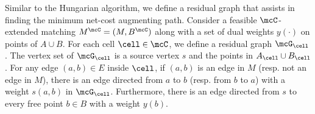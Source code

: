 Similar to the Hungarian algorithm, we define a residual graph that assists in finding the minimum net-cost augmenting path. Consider a feasible $\mcC$-extended matching $M^{\mcC}=(M,B^{\mcC})$ along with a set of dual weights $y(\cdot)$ on points of $A\cup B$. For each cell $\cell \in \mcC$, we define a residual graph $\mcG_{\cell}$. The vertex set of $\mcG_{\cell}$ is a source vertex $s$ and the points in $A_{\cell}\cup B_{\cell}$. For any edge $(a,b)\in E$ inside $\cell$, if $(a,b)$ is an edge in $M$ (resp. not an edge in $M$), there is an edge directed from $a$ to $b$ (resp. from $b$ to $a$) with a weight $s(a,b)$ in $\mcG_\cell$. Furthermore, there is an edge directed from $s$ to every free point $b\in B$ with a weight $y(b)$.
